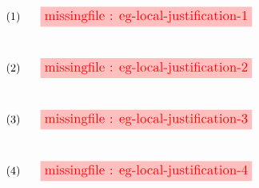 \newcommand{\stkf}{\tikzfig{1.2}{0.5}}
\newcommand{\vsp}{\vspace{1cm}}
$$
\begin{array}{ll@{\vsp}}
  (1) & \stkf{eg-local-justification-1} \\
  (2) & \stkf{eg-local-justification-2} \\
  (3) & \stkf{eg-local-justification-3} \\
  (4) & \stkf{eg-local-justification-4}
\end{array}
$$
